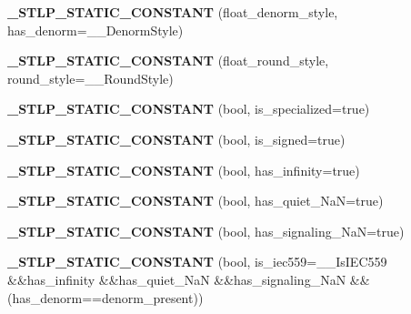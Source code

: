 \begin{DoxyCompactItemize}
{\bfseries \+\_\+\+S\+T\+L\+P\+\_\+\+S\+T\+A\+T\+I\+C\+\_\+\+C\+O\+N\+S\+T\+A\+NT} (float\+\_\+denorm\+\_\+style, has\+\_\+denorm=\+\_\+\+\_\+\+Denorm\+Style)
\item 
\mbox{\label{class___floating__limits_a0c6757cb29f5f0901ba6c343ecd814bf}} 
{\bfseries \+\_\+\+S\+T\+L\+P\+\_\+\+S\+T\+A\+T\+I\+C\+\_\+\+C\+O\+N\+S\+T\+A\+NT} (float\+\_\+round\+\_\+style, round\+\_\+style=\+\_\+\+\_\+\+Round\+Style)
\item 
\mbox{\label{class___floating__limits_ab438715ab7abe27ca8e08f8824050bc4}} 
{\bfseries \+\_\+\+S\+T\+L\+P\+\_\+\+S\+T\+A\+T\+I\+C\+\_\+\+C\+O\+N\+S\+T\+A\+NT} (bool, is\+\_\+specialized=true)
\item 
\mbox{\label{class___floating__limits_a13bd8812e8ff1a7eb49f9c6286259d56}} 
{\bfseries \+\_\+\+S\+T\+L\+P\+\_\+\+S\+T\+A\+T\+I\+C\+\_\+\+C\+O\+N\+S\+T\+A\+NT} (bool, is\+\_\+signed=true)
\item 
\mbox{\label{class___floating__limits_abd40abc648b46fe73a362ca53ec41584}} 
{\bfseries \+\_\+\+S\+T\+L\+P\+\_\+\+S\+T\+A\+T\+I\+C\+\_\+\+C\+O\+N\+S\+T\+A\+NT} (bool, has\+\_\+infinity=true)
\item 
\mbox{\label{class___floating__limits_a1726d5e7c1774814bad8469d3dd70cdf}} 
{\bfseries \+\_\+\+S\+T\+L\+P\+\_\+\+S\+T\+A\+T\+I\+C\+\_\+\+C\+O\+N\+S\+T\+A\+NT} (bool, has\+\_\+quiet\+\_\+\+NaN=true)
\item 
\mbox{\label{class___floating__limits_ab31b5bcb3bcbb8770bd7be40cd303280}} 
{\bfseries \+\_\+\+S\+T\+L\+P\+\_\+\+S\+T\+A\+T\+I\+C\+\_\+\+C\+O\+N\+S\+T\+A\+NT} (bool, has\+\_\+signaling\+\_\+\+NaN=true)
\item 
\mbox{\label{class___floating__limits_a3e661d1066807707bb5c66e5b31b4de3}} 
{\bfseries \+\_\+\+S\+T\+L\+P\+\_\+\+S\+T\+A\+T\+I\+C\+\_\+\+C\+O\+N\+S\+T\+A\+NT} (bool, is\+\_\+iec559=\+\_\+\+\_\+\+Is\+I\+E\+C559 \&\&has\+\_\+infinity \&\&has\+\_\+quiet\+\_\+\+NaN \&\&has\+\_\+signaling\+\_\+\+NaN \&\&(has\+\_\+denorm==denorm\+\_\+present))
\item 
\mbox{\label{class___floating__limits_a5f16f536097da335fce2779bd8533085}} 

\end{DoxyCompactItemize}

